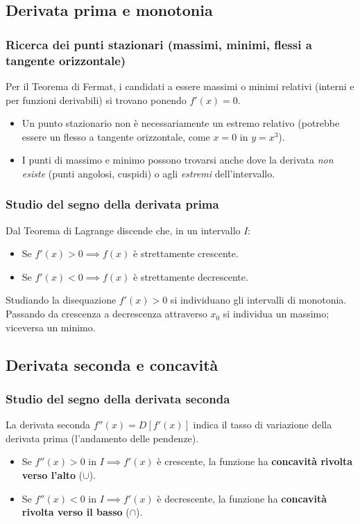 \subsection{Derivata prima e monotonia}
\subsubsection{Ricerca dei punti stazionari (massimi, minimi, flessi a tangente orizzontale)}
Per il Teorema di Fermat, i candidati a essere massimi o minimi relativi (interni e per funzioni derivabili) si trovano ponendo $f'(x) = 0$.
\begin{itemize}
    \item Un punto stazionario non è necessariamente un estremo relativo (potrebbe essere un flesso a tangente orizzontale, come $x=0$ in $y=x^3$).
    \item I punti di massimo e minimo possono trovarsi anche dove la derivata \textit{non esiste} (punti angolosi, cuspidi) o agli \textit{estremi} dell'intervallo.
\end{itemize}

\subsubsection{Studio del segno della derivata prima}
Dal Teorema di Lagrange discende che, in un intervallo $I$:
\begin{itemize}
    \item Se $f'(x) > 0 \implies f(x)$ è strettamente crescente.
    \item Se $f'(x) < 0 \implies f(x)$ è strettamente decrescente.
\end{itemize}
Studiando la disequazione $f'(x) > 0$ si individuano gli intervalli di monotonia. Passando da crescenza a decrescenza attraverso $x_0$ si individua un massimo; viceversa un minimo.

\subsection{Derivata seconda e concavità}
\subsubsection{Studio del segno della derivata seconda}
La derivata seconda $f''(x) = D[f'(x)]$ indica il tasso di variazione della derivata prima (l'andamento delle pendenze).
\begin{itemize}
    \item Se $f''(x) > 0$ in $I \implies f'(x)$ è crescente, la funzione ha \textbf{concavità rivolta verso l'alto} ($\cup$).
    \item Se $f''(x) < 0$ in $I \implies f'(x)$ è decrescente, la funzione ha \textbf{concavità rivolta verso il basso} ($\cap$).
\end{itemize}

